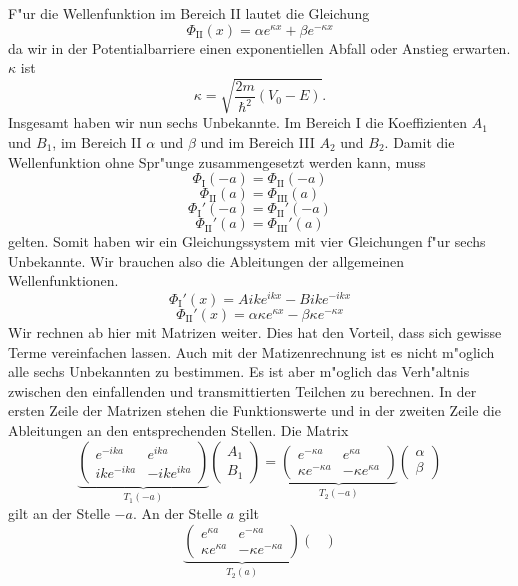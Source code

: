 \begin{refsection}
F"ur die Wellenfunktion im Bereich \textrm{II} lautet die Gleichung
\[
\Phi_\text{II}(x) = \alpha e^{\kappa x} + \beta e^{-\kappa x}
\]
da wir in der Potentialbarriere einen exponentiellen Abfall oder Anstieg erwarten. 
$\kappa$ ist
\[
\kappa = \sqrt{\frac{2m}{\hbar^2}(V_0 - E)}.
\]
Insgesamt haben wir nun sechs Unbekannte. 
Im Bereich \textrm{I} die Koeffizienten $A_1$ und $B_1$, im Bereich \textrm{II} $\alpha$ und $\beta$ und im Bereich \textrm{III} $A_2$ und $B_2$. 
Damit die Wellenfunktion ohne Spr"unge zusammengesetzt werden kann, muss
\[
\Phi_\text{I}(-a) = \Phi_\text{II}(-a)
\]
\[
\Phi_\text{II}(a) = \Phi_\text{III}(a)
\]
\[
\Phi_\text{I}'(-a) = \Phi_\text{II}'(-a)
\]
\[
\Phi_\text{II}'(a) = \Phi_\text{III}'(a)
\]
gelten. 
Somit haben wir ein Gleichungssystem mit vier Gleichungen f"ur sechs Unbekannte. 
Wir brauchen also die Ableitungen der allgemeinen Wellenfunktionen.
\[
\Phi_\text{I}'(x) = Aike^{ikx} - Bike^{-ikx}
\]
\[
\Phi_\text{II}'(x) = \alpha \kappa e^{\kappa x} - \beta \kappa e^{-\kappa x}
\]
Wir rechnen ab hier mit Matrizen weiter. 
Dies hat den Vorteil, dass sich gewisse Terme vereinfachen lassen. 
Auch mit der Matizenrechnung ist es nicht m"oglich alle sechs Unbekannten zu bestimmen. 
Es ist aber m"oglich das Verh"altnis zwischen den einfallenden und transmittierten Teilchen zu berechnen. 
In der ersten Zeile der Matrizen stehen die Funktionswerte und in der zweiten Zeile die Ableitungen an den entsprechenden Stellen. 
Die Matrix 
\[
\underbrace{
\begin{pmatrix}
e^{-ika}
&
e^{ika}
\\
ike^{-ika}
&
-ike^{ika}
\end{pmatrix}
}_{T_1(-a)}
\begin{pmatrix}
A_1
\\
B_1
\end{pmatrix}
 = 
\underbrace{
\begin{pmatrix}
e^{-\kappa a}
&
e^{\kappa a}
\\
\kappa e^{-\kappa a}
&
-\kappa e^{\kappa a}
\end{pmatrix}
}_{T_2(-a)}
\begin{pmatrix}
\alpha
\\
\beta
\end{pmatrix}
\]
gilt an der Stelle $-a$.
An der Stelle $a$ gilt
\[
\underbrace{
\begin{pmatrix}
e^{\kappa a}
&
e^{-\kappa a}
\\
\kappa e^{\kappa a}
&
-\kappa e^{-\kappa a}
\end{pmatrix}
}_{T_2(a)}
\begin{pmatrix}

\end{pmatrix}\]
\end{refsection}
